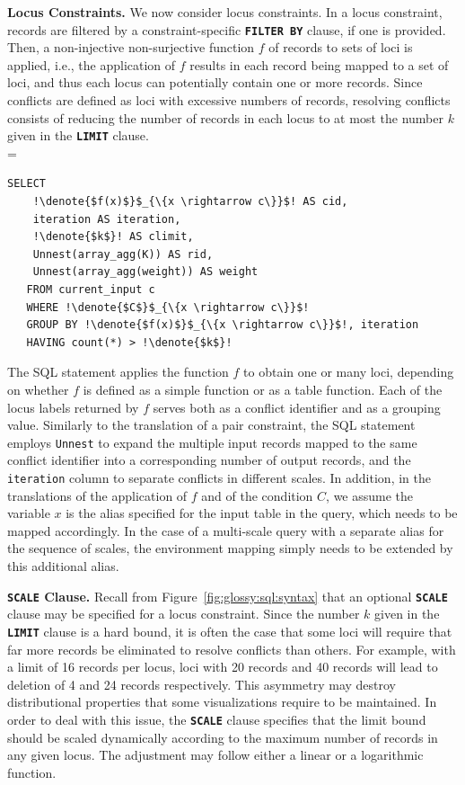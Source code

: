 \documentclass[11pt, oneside]{report}
\newcommand{\minisec}[1]{\noindent\textbf{#1.}}
\newcommand{\denote}[1]{\text{$[\![ $#1$ ]\!]$}}
\begin{document}
{\minisec{Locus Constraints}
We now consider locus constraints. In a locus constraint, records are filtered by a constraint-specific \textbf{\texttt{FILTER BY}} clause, if one is provided. Then, a non-injective non-surjective function $f$ of records to sets of loci is applied, i.e., the application of $f$ results in each record being mapped to a set of loci, and thus each locus can potentially contain one or more records. Since conflicts are defined as loci with excessive numbers of records, resolving conflicts consists of reducing the number of records in each locus to at most the number $k$ given in the \textbf{\texttt{LIMIT}} clause. \\

\denote{\lstinline!FOREACH LOCUS MAP BY!$\;f(x)\;$\lstinline!  FILTER BY!$\;C\;$\lstinline!LIMIT !$\;k$} =
\begin{lstlisting}[mathescape,escapechar=!]
   SELECT
    !\denote{$f(x)$}$_{\{x \rightarrow c\}}$! AS cid,
    iteration AS iteration,
    !\denote{$k$}! AS climit,
    Unnest(array_agg(K)) AS rid,
    Unnest(array_agg(weight)) AS weight
   FROM current_input c
   WHERE !\denote{$C$}$_{\{x \rightarrow c\}}$!
   GROUP BY !\denote{$f(x)$}$_{\{x \rightarrow c\}}$!, iteration
   HAVING count(*) > !\denote{$k$}!
\end{lstlisting} 
 
The SQL statement applies the function $f$ to obtain one or many loci, depending on whether $f$ is defined as a simple function or as a table function. Each of the locus labels returned by $f$ serves both as a conflict identifier and as a grouping value. Similarly to the translation of a pair constraint, the SQL statement employs \texttt{Unnest} to expand the multiple input records mapped to the same conflict identifier into a corresponding number of output records, and the \texttt{iteration} column to separate conflicts in different scales. In addition, in the translations of the application of $f$ and of the condition $C$, we assume the variable $x$ is the alias specified for the input table in the query, which needs to be mapped accordingly. In the case of a multi-scale query with a separate alias for the sequence of scales, the environment mapping simply needs to be extended by this additional alias. 

\minisec{\texttt{SCALE} Clause}
Recall from Figure~\ref{fig:glossy:sql:syntax} that an optional \textbf{\texttt{SCALE}} clause may be specified for a locus constraint. Since the number $k$ given in the \textbf{\texttt{LIMIT}} clause is a hard bound, it is often the case that some loci will require that far more records be eliminated to resolve conflicts than others. For example, with a limit of 16 records per locus, loci with 20 records and 40 records will lead to deletion of 4 and 24 records respectively. This asymmetry may destroy distributional properties that some visualizations require to be maintained. In order to deal with this issue, the \textbf{\texttt{SCALE}} clause specifies that the limit bound should be scaled dynamically according to the maximum number of records in any given locus. The adjustment may follow either a linear or a logarithmic function.  

}
\end{document}
